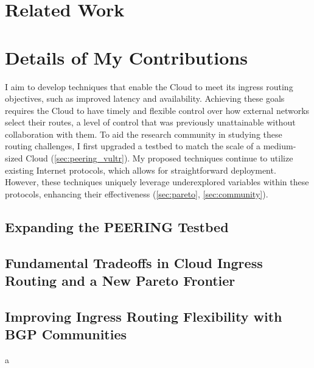 \documentclass[sigconf,nonacm,screen,letterpaper,10pt]{acmart}
\begin{document}
\hypertarget{related-work}{%
\section{Related Work}\label{related-work}}

\hypertarget{details-of-my-contributions}{%
\section{Details of My
Contributions}\label{details-of-my-contributions}}

I aim to develop techniques that enable the Cloud to meet its ingress
routing objectives, such as improved latency and availability. Achieving
these goals requires the Cloud to have timely and flexible control over
how external networks select their routes, a level of control that was
previously unattainable without collaboration with them. To aid the
research community in studying these routing challenges, I first
upgraded a testbed to match the scale of a medium-sized Cloud
(\cref{sec:peering_vultr}). My proposed techniques continue to utilize
existing Internet protocols, which allows for straightforward
deployment. However, these techniques uniquely leverage underexplored
variables within these protocols, enhancing their effectiveness
(\cref{sec:pareto}, \cref{sec:community}).

\hypertarget{expanding-the-peering-testbed}{%
\subsection{Expanding the PEERING
Testbed}\label{expanding-the-peering-testbed}}

\label{sec:peering_vultr}

\hypertarget{fundamental-tradeoffs-in-cloud-ingress-routing-and-a-new-pareto-frontier}{%
\subsection{Fundamental Tradeoffs in Cloud Ingress Routing and a New
Pareto
Frontier}\label{fundamental-tradeoffs-in-cloud-ingress-routing-and-a-new-pareto-frontier}}

\label{sec:pareto}

\hypertarget{improving-ingress-routing-flexibility-with-bgp-communities}{%
\subsection{Improving Ingress Routing Flexibility with BGP
Communities}\label{improving-ingress-routing-flexibility-with-bgp-communities}}

\label{sec:community} a

\iffalse

END OF PAPER

\fi
{\small\balance}
\end{document}
